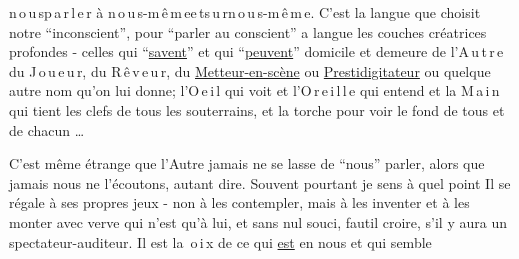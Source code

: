   \mbox{n\,o\,u\,s}\quad\mbox{p\,a\,r\,l\,e\,r} à \mbox{n\,o\,u\,s-m\,ê\,m\,e}\quad\mbox{e\,t}\quad\mbox{s\,u\,r}\quad\mbox{n\,o\,u\,s-m\,ê\,m\,e}. C'est la langue  que choisit notre ``inconscient'', pour ``parler au conscient'' a langue  les couches créatrices profondes - celles qui ``\uline{savent}'' et qui ``\uline{peuvent}''\handwritten{,}\deleted{\unsure{;}} domicile et demeure de l'\mbox{A\,u\,t\,r\,e}\deleted{\unsure{(}} \handwritten{,} du \mbox{J\,o\,u\,e\,u\,r}, du \mbox{R\,ê\,v\,e\,u\,r}, du  \uline{Metteur-en-scène} ou \uline{Prestidigitateur} ou quelque autre nom qu'on lui donne; l'\mbox{O\,e\,i\,l} qui voit et l'\mbox{O\,r\,e\,i\,l\,l\,e} qui entend et la \mbox{M\,a\,i\,n} qui tient les clefs de tous les  souterrains, et la torche  pour  voir le fond de tous et de chacun \ldots

C'est même étrange que l'Autre jamais ne se lasse de ``nous'' parler, alors que jamais nous ne l'écoutons, autant dire. Souvent pourtant je sens  à quel point Il se régale à ses propres jeux - non  à les contempler, mais à les inventer et à les monter  avec  verve  qui n'est qu'à lui, et sans nul souci, faut\handwritten{-}il croire, s'il y aura un spectateur-auditeur. Il est la \mbox{\,o\,i\,x} de ce qui \uline{est} en nous et qui semble

